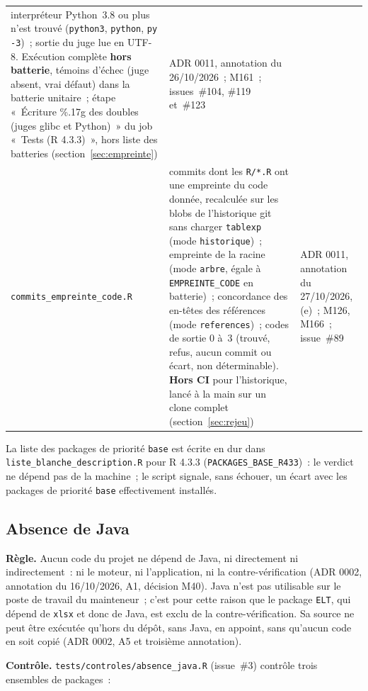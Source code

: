 \documentclass[a4paper,11pt]{article}
\newcommand{\code}[1]{\texttt{\small #1}}
\begin{document}
\begin{center}
\begin{longtable}{@{}p{4.6cm}p{7.4cm}p{2.8cm}@{}}
interpréteur Python~3.8 ou plus n'est trouvé (\code{python3},
\code{python}, \code{py -3})~; sortie du juge lue en UTF-8.
Exécution complète \textbf{hors batterie}, témoins d'échec (juge absent,
vrai défaut) dans la batterie unitaire~; étape «~Écriture \%.17g des doubles (juges glibc
et Python)~» du job «~Tests (R 4.3.3)~», hors liste des batteries
(section~\ref{sec:empreinte}) & ADR 0011, annotation du 26/10/2026~; M161~;
issues~\#104, \#119 et~\#123 \\
\code{commits\_empreinte\_}\newline\code{code.R} & commits dont les
\code{R/*.R} ont une empreinte du code donnée, recalculée sur les blobs de
l'historique git sans charger \code{tablexp} (mode \code{historique})~;
empreinte de la racine (mode \code{arbre}, égale à \code{EMPREINTE\_CODE}
en batterie)~; concordance des en-têtes des références (mode
\code{references})~; codes de sortie 0 à~3 (trouvé, refus, aucun commit ou
écart, non déterminable). \textbf{Hors CI} pour l'historique, lancé à la
main sur un clone complet (section~\ref{sec:rejeu}) & ADR 0011, annotation
du 27/10/2026, (e)~; M126, M166~; issue~\#89 \\
\end{longtable}
\end{center}

\noindent
La liste des packages de priorité \code{base} est écrite en dur dans
\code{liste\_blanche\_description.R} pour R 4.3.3 (\code{PACKAGES\_BASE\_R433})~:
le verdict ne dépend pas de la machine~; le script signale, sans échouer, un
écart avec les packages de priorité \code{base} effectivement installés.

\subsection{Absence de Java}
\label{sec:absence-java}

\textbf{Règle.} Aucun code du projet ne dépend de Java, ni directement ni
indirectement~: ni le moteur, ni l'application, ni la contre-vérification
(ADR 0002, annotation du 16/10/2026, A1, décision M40). Java n'est pas
utilisable sur le poste de travail du mainteneur~; c'est pour cette raison
que le package \code{ELT}, qui dépend de \code{xlsx} et donc de Java, est exclu
de la contre-vérification. Sa source ne peut être exécutée qu'hors du dépôt,
sans Java, en appoint, sans qu'aucun code en soit copié (ADR 0002, A5 et
troisième annotation).

\medskip
\textbf{Contrôle.} \code{tests/controles/absence\_java.R} (issue~\#3) contrôle
trois ensembles de packages~:
\end{document}
